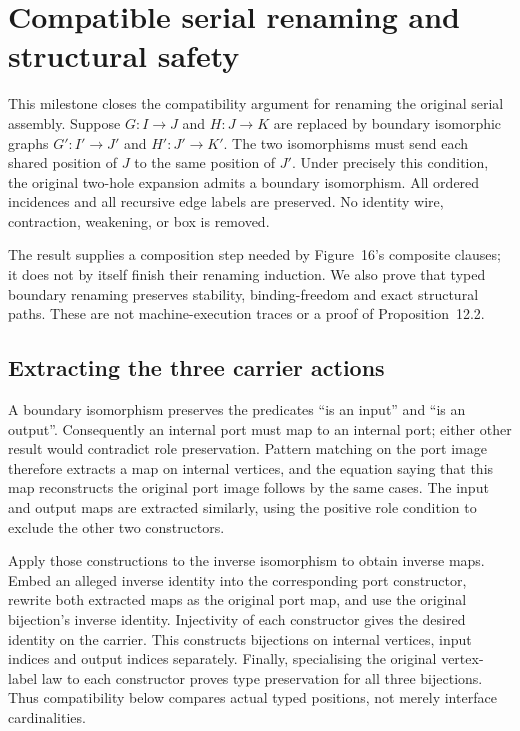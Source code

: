\clearpage
\section{Compatible serial renaming and structural safety}
\label{sec:copying-serial-renaming}
This milestone closes the compatibility argument for renaming the original
serial assembly. Suppose $G:I\to J$ and $H:J\to K$ are replaced by boundary
isomorphic graphs $G':I'\to J'$ and $H':J'\to K'$. The two isomorphisms must
send each shared position of $J$ to the same position of $J'$. Under precisely
this condition, the original two-hole expansion admits a boundary isomorphism.
All ordered incidences and all recursive edge labels are preserved. No identity
wire, contraction, weakening, or box is removed.

The result supplies a composition step needed by Figure~16's composite clauses;
it does not by itself finish their renaming induction. We also prove that typed
boundary renaming preserves stability, binding-freedom and exact structural
paths. These are not machine-execution traces or a proof of Proposition~12.2.

\subsection{Extracting the three carrier actions}
A boundary isomorphism preserves the predicates ``is an input'' and ``is an
output''. Consequently an internal port must map to an internal port; either
other result would contradict role preservation. Pattern matching on the port
image therefore extracts a map on internal vertices, and the equation saying
that this map reconstructs the original port image follows by the same cases.
The input and output maps are extracted similarly, using the positive role
condition to exclude the other two constructors.


Apply those constructions to the inverse isomorphism to obtain inverse
maps. Embed an alleged inverse identity into the corresponding port constructor,
rewrite both extracted maps as the original port map, and use the original
bijection's inverse identity. Injectivity of each constructor gives the desired
identity on the carrier. This constructs bijections on internal vertices,
input indices and output indices separately. Finally, specialising the original
vertex-label law to each constructor proves type preservation for all three
bijections. Thus compatibility below compares actual typed positions, not merely
interface cardinalities.

